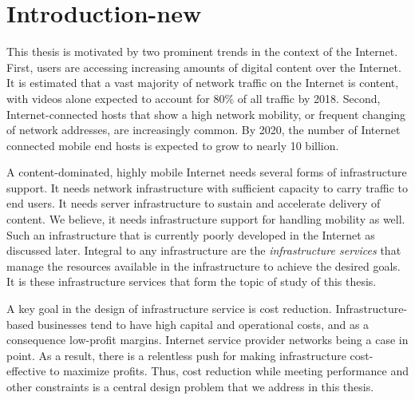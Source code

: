 \chapter{Introduction-new}

This thesis is motivated by two prominent trends in the context of the Internet. First, users are accessing increasing amounts of digital content over the Internet. It is estimated that a vast majority of network traffic on the Internet is content, with videos alone expected to account for 80\% of all traffic by 2018. Second, Internet-connected hosts that show a high network mobility, or frequent changing of network addresses, are increasingly common. By 2020, the number of Internet connected mobile end hosts is expected to grow to nearly 10 billion.

A content-dominated, highly mobile Internet needs several forms of infrastructure support. It needs network infrastructure with sufficient capacity to carry traffic to end users. It needs server infrastructure to sustain and accelerate delivery of content. We believe, it needs infrastructure support for handling mobility as well. Such an infrastructure that is currently poorly developed in the Internet as discussed later. Integral to any infrastructure are the \emph{infrastructure services} that manage the resources available in the infrastructure to achieve the desired goals. It is these infrastructure services that form the topic of study of this thesis.

A key goal in the design of infrastructure service is cost reduction. Infrastructure-based businesses tend to have high capital and operational costs, and as a consequence low-profit margins. Internet service provider networks being a case in point. As a result, there is a relentless push for making infrastructure cost-effective to maximize profits. Thus, cost reduction while meeting performance and other constraints is a central design problem that we address in this thesis. 

